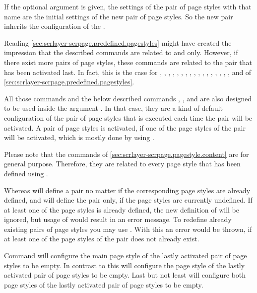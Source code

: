 If the optional argument  is given, the settings of the
pair of page styles with that name are the initial settings of the new pair of
page styles. So the new pair inherits the configuration of the .

Reading \autoref{sec:scrlayer-scrpage.predefined.pagestyles} might have
created the impression that the described commands are related to
 and  only. However, if
there exist more pairs of page styles, these commands are related to the pair
that has been activated last. In fact, this is the case for ,
, , , ,
, , , ,
, , , , ,
, , , and  of
\autoref{sec:scrlayer-scrpage.predefined.pagestyles}.

All those commands and the below described commands
, , and
 are also designed to be used inside the argument
. In that case, they are a kind of default configuration of
the pair of page styles that is executed each time the pair will be
activated. A pair of page styles is activated, if one of the page styles of
the pair will be activated, which is mostly done by using
.

Please note that the commands of
\autoref{sec:scrlayer-scrpage.pagestyle.content} are for general
purpose. Therefore, they are related to every page style that has been defined
using .

Whereas  will define a pair no matter if the
corresponding page styles are already defined,  and
 will define the pair only, if the page styles
are currently undefined. If at least one of the page styles is already
defined, the new definition of  will be
ignored, but usage of  would result in an error
message. To redefine already existing pairs of page styles you may use
. With this an error would be thrown, if at least
one of the page styles of the pair does not already exist.%
\EndIndexGroup


\begin{Declaration}
\end{Declaration}
Command  will configure the main page style
of the lastly activated pair of page styles to be empty. In contrast to this
 will configure the  page
style of the lastly activated pair of page styles to be empty. Last but not
least  will configure both page styles of the
lastly activated pair of page styles to be empty.

